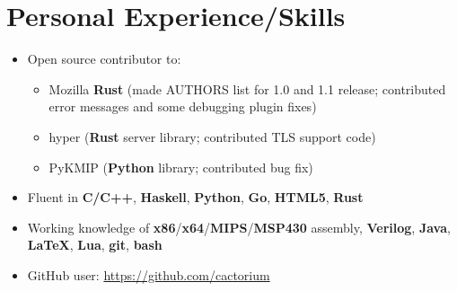 \documentclass{my_resume}
\begin{document}
\section{Personal Experience/Skills}
\begin{itemize}
    \itemsep0em
	\item Open source contributor to:
	\begin{itemize}
        \itemsep0em
		\item Mozilla \textbf{Rust} (made AUTHORS list for 1.0 and 1.1 release;
			contributed error messages and some debugging plugin fixes)
		\item hyper (\textbf{Rust} server library; contributed TLS support code)
		\item PyKMIP (\textbf{Python} library; contributed bug fix)
	\end{itemize}
	\item Fluent in \textbf{C/C++}, \textbf{Haskell}, \textbf{Python},
		\textbf{Go}, \textbf{HTML5}, \textbf{Rust}
	\item Working knowledge of \textbf{x86}/\textbf{x64}/\textbf{MIPS}/\textbf{MSP430} assembly,
		\textbf{Verilog}, \textbf{Java}, \textbf{LaTeX},
		\textbf{Lua}, \textbf{git}, \textbf{bash}
    \item GitHub user: \url{https://github.com/cactorium}
\end{itemize}
\end{document}
